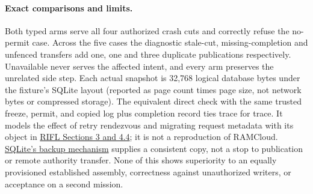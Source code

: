 \documentclass{article}
\begin{document}
\paragraph{Exact comparisons and limits.}
Both typed arms serve all four authorized crash cuts and correctly
refuse the no-permit case. Across the five cases the diagnostic
stale-cut, missing-completion and unfenced transfers add one, one
and three duplicate publications respectively. Unavailable never
serves the affected intent, and every arm preserves the unrelated
side step. Each actual snapshot is 32,768 logical database bytes under
the fixture's SQLite layout (reported as page count times page
size, not network bytes or compressed storage). The equivalent
direct check with the same trusted freeze, permit, and copied log
plus completion record ties trace for trace. It models the effect
of retry rendezvous and migrating request metadata with its
object in \href{https://web.stanford.edu/~ouster/cgi-bin/papers/rifl.pdf}{RIFL
Sections 3 and 4.4}; it is not a reproduction of RAMCloud.
\href{https://www.sqlite.org/backup.html}{SQLite's backup mechanism}
supplies a consistent copy, not a stop to publication or
remote authority transfer. None of this shows superiority to an
equally provisioned established assembly, correctness against
unauthorized writers, or acceptance on a second mission.
\end{document}
